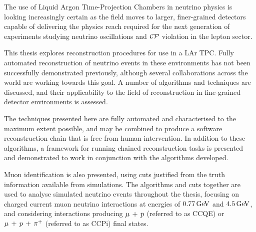 The use of Liquid Argon Time-Projection Chambers in neutrino physics is looking increasingly certain as the field moves to larger, finer-grained detectors capable of delivering the physics reach required for the next generation of experiments studying neutrino oscillations and $\mathcal{C}\mathcal{P}$ violation in the lepton sector. 

This thesis explores reconstruction procedures for use in a \ac{LAr TPC}. Fully automated reconstruction of neutrino events in these environments has not been successfully demonstrated previously, although several collaborations across the world are working towards this goal. A number of algorithms and techniques are discussed, and their applicability to the field of reconstruction in fine-grained detector environments is assessed.

The techniques presented here are fully automated and characterised to the maximum extent possible, and may be combined to produce a software reconstruction chain that is free from human intervention. In addition to these algorithms, a framework for running chained reconstruction tasks is presented and demonstrated to work in conjunction with the algorithms developed.

Muon identification is also presented, using cuts justified from the truth information available from simulations. The algorithms and cuts together are used to analyse simulated neutrino events throughout the thesis, focusing on charged current muon neutrino interactions at energies of $0.77\,\mathrm{GeV}$ and $4.5\,\mathrm{GeV}$, and considering interactions producing $\mu\,+\,p$ (referred to as CCQE) or $\mu\,+\,p\,+\,\pi^{+}$ (referred to as CCPi) final states.


